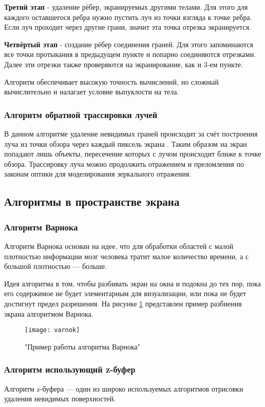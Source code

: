 \textbf{Третий этап} - удаление рёбер, экранируемых другими телами. Для этого для каждого оставшегося ребра нужно пустить луч из точки взгляда к точке ребра. Если луч проходит через другие грани, значит эта точка отрезка экранируется. 

\textbf{Четвёртый этап} - создание рёбер соединения граней. Для этого запоминаются все точки протыкания в предыдущем пункте и попарно соединяются отрезками. Далее эти отрезки также проверяются на экранирование, как и 3-ем пункте.

Алгоритм обеспечивает высокую точность вычислений, но сложный вычислительно и налагает условие выпуклости на тела.

\subsubsection{Алгоритм обратной трассировки лучей}
В данном алгоритме удаление невидимых граней происходит за счёт построения луча из точки обзора через каждый пиксель экрана \cite{gabriella}. Таким образом на экран попадают лишь объекты, пересечение которых с лучом происходит ближе к точке обзора. Трассировку луча можно продолжить отражением и преломления по законам оптики для моделирования зеркального отражения.

\subsection{Алгоритмы в пространстве экрана}
\subsubsection{Алгоритм Варнока}

Алгоритм Варнока основан на идее, что для обработки областей с малой плотностью информации мозг человека тратит малое количество времени, а с большой плотностью — больше.

Идея алгоритма в том, чтобы разбивать экран на окна и подокна до тех пор, пока его содержимое не будет элементарным для визуализации, или пока не будет достигнут предел разрешения. На рисунке \ref{fig:varnok} представлен пример разбиения экрана алгоритмом Варнока.

\begin{figure}
	\centering
	\texttt{[image: varnok]}
	\caption{"Пример работы алгоритма Варнока"}
	\label{fig:varnok}
\end{figure}

\subsubsection{Алгоритм использующий z-буфер}
Алгоритм z-буфера — один из широко используемых алгоритмов отрисовки удаления невидимых поверхностей.

